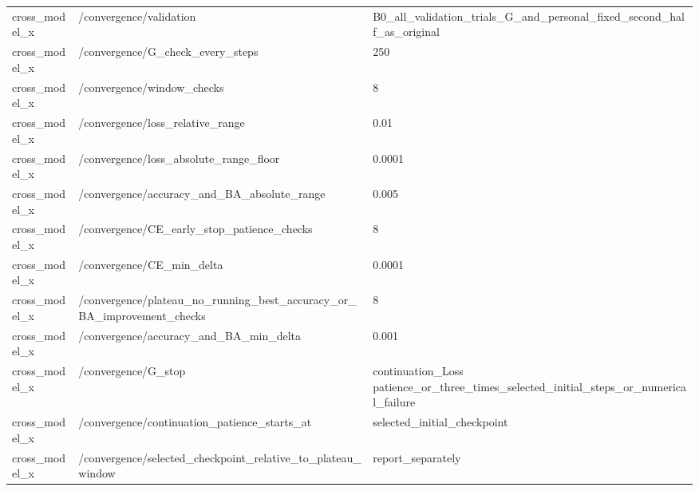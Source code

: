 \begin{longtable}{p{.65in}p{2.8in}p{3.2in}}
cross\_\allowbreak{}model\_\allowbreak{}x & /convergence/validation & B0\_\allowbreak{}all\_\allowbreak{}validation\_\allowbreak{}trials\_\allowbreak{}G\_\allowbreak{}and\_\allowbreak{}personal\_\allowbreak{}fixed\_\allowbreak{}second\_\allowbreak{}half\_\allowbreak{}as\_\allowbreak{}original \\
cross\_\allowbreak{}model\_\allowbreak{}x & /convergence/G\_\allowbreak{}check\_\allowbreak{}every\_\allowbreak{}steps & 250 \\
cross\_\allowbreak{}model\_\allowbreak{}x & /convergence/window\_\allowbreak{}checks & 8 \\
cross\_\allowbreak{}model\_\allowbreak{}x & /convergence/loss\_\allowbreak{}relative\_\allowbreak{}range & 0.01 \\
cross\_\allowbreak{}model\_\allowbreak{}x & /convergence/loss\_\allowbreak{}absolute\_\allowbreak{}range\_\allowbreak{}floor & 0.0001 \\
cross\_\allowbreak{}model\_\allowbreak{}x & /convergence/accuracy\_\allowbreak{}and\_\allowbreak{}BA\_\allowbreak{}absolute\_\allowbreak{}range & 0.005 \\
cross\_\allowbreak{}model\_\allowbreak{}x & /convergence/CE\_\allowbreak{}early\_\allowbreak{}stop\_\allowbreak{}patience\_\allowbreak{}checks & 8 \\
cross\_\allowbreak{}model\_\allowbreak{}x & /convergence/CE\_\allowbreak{}min\_\allowbreak{}delta & 0.0001 \\
cross\_\allowbreak{}model\_\allowbreak{}x & /convergence/plateau\_\allowbreak{}no\_\allowbreak{}running\_\allowbreak{}best\_\allowbreak{}accuracy\_\allowbreak{}or\_\allowbreak{}BA\_\allowbreak{}improvement\_\allowbreak{}checks & 8 \\
cross\_\allowbreak{}model\_\allowbreak{}x & /convergence/accuracy\_\allowbreak{}and\_\allowbreak{}BA\_\allowbreak{}min\_\allowbreak{}delta & 0.001 \\
cross\_\allowbreak{}model\_\allowbreak{}x & /convergence/G\_\allowbreak{}stop & continuation\_\allowbreak{}Loss patience\_\allowbreak{}or\_\allowbreak{}three\_\allowbreak{}times\_\allowbreak{}selected\_\allowbreak{}initial\_\allowbreak{}steps\_\allowbreak{}or\_\allowbreak{}numerical\_\allowbreak{}failure \\
cross\_\allowbreak{}model\_\allowbreak{}x & /convergence/continuation\_\allowbreak{}patience\_\allowbreak{}starts\_\allowbreak{}at & selected\_\allowbreak{}initial\_\allowbreak{}checkpoint \\
cross\_\allowbreak{}model\_\allowbreak{}x & /convergence/selected\_\allowbreak{}checkpoint\_\allowbreak{}relative\_\allowbreak{}to\_\allowbreak{}plateau\_\allowbreak{}window & report\_\allowbreak{}separately \\

\end{longtable}
